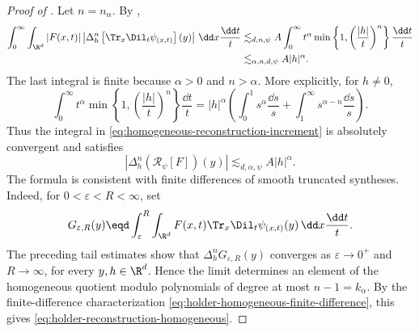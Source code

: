 \begin{proof}[Proof of ]
  {}
  Let \(n = n_{\alpha}\). By ,
  \[
    \int_0^{\infty} \int_{\R^d}
    |F(x, t)|
    \left|
      \Delta_h^n
      \left[\Tr_x \Dil_t \psi_{(x, t)}\right](y)
    \right|
    \, \dd x \frac{\dd t}{t}
    \begin{aligned}[t]
    &\lesssim_{d, n, \psi}
    A
    \int_0^{\infty}
    t^{\alpha}
    \min
    \left\{
      1,
      \left(\frac{|h|}{t}\right)^n
    \right\}
    \frac{\dd t}{t}
    \\
    &\lesssim_{\alpha, n, d, \psi}
    A |h|^{\alpha}.
    \end{aligned}
  \]
  The last integral is finite because \(\alpha > 0\) and \(n > \alpha\). More
  explicitly, for \(h \neq 0\),
  \[
    \int_0^{\infty}
    t^{\alpha}
    \min
    \left\{
      1,
      \left(\frac{|h|}{t}\right)^n
    \right\}
    \frac{\dd t}{t}
    =
    |h|^{\alpha}
    \left(
      \int_0^1 s^{\alpha} \frac{\dd s}{s}
      +
      \int_1^{\infty} s^{\alpha - n} \frac{\dd s}{s}
    \right).
  \]
  Thus the integral in \eqref{eq:homogeneous-reconstruction-increment} is
  absolutely convergent and satisfies
  \[
    |\Delta_h^n(\mathcal{R}_{\psi}[F])(y)|
    \lesssim_{d, \alpha, \psi}
    A |h|^{\alpha}.
  \]
  The formula is consistent with finite differences of smooth truncated
  syntheses. Indeed, for \(0 < \varepsilon < R < \infty\), set
  \[
    G_{\varepsilon, R}(y)
    \eqd
    \int_{\varepsilon}^R \int_{\R^d}
    F(x, t) \Tr_x \Dil_t \psi_{(x, t)}(y)
    \, \dd x \frac{\dd t}{t}.
  \]
  The preceding tail estimates show that
  \(\Delta_h^n G_{\varepsilon, R}(y)\) converges as
  \(\varepsilon \to 0^+\) and \(R \to \infty\), for every
  \(y, h \in \R^d\). Hence the limit determines an element of the homogeneous
  quotient modulo polynomials of degree at most \(n - 1 = k_{\alpha}\). By the
  finite-difference characterization
  \eqref{eq:holder-homogeneous-finite-difference}, this gives
  \eqref{eq:holder-reconstruction-homogeneous}.


\end{proof}
